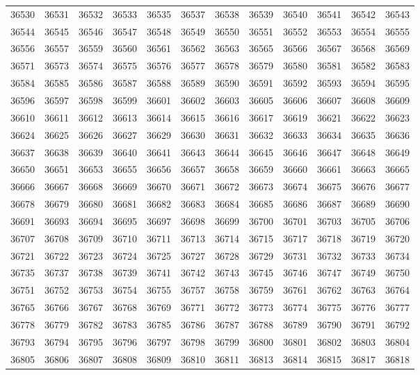 \begin{center}
\begin{longtable}{llllllllllll}
36530 &36531 &36532 &36533 &36535 &36537 &36538 &36539 &36540 &36541 &36542 &36543 \\
36544 &36545 &36546 &36547 &36548 &36549 &36550 &36551 &36552 &36553 &36554 &36555 \\
36556 &36557 &36559 &36560 &36561 &36562 &36563 &36565 &36566 &36567 &36568 &36569 \\
36571 &36573 &36574 &36575 &36576 &36577 &36578 &36579 &36580 &36581 &36582 &36583 \\
36584 &36585 &36586 &36587 &36588 &36589 &36590 &36591 &36592 &36593 &36594 &36595 \\
36596 &36597 &36598 &36599 &36601 &36602 &36603 &36605 &36606 &36607 &36608 &36609 \\
36610 &36611 &36612 &36613 &36614 &36615 &36616 &36617 &36619 &36621 &36622 &36623 \\
36624 &36625 &36626 &36627 &36629 &36630 &36631 &36632 &36633 &36634 &36635 &36636 \\
36637 &36638 &36639 &36640 &36641 &36643 &36644 &36645 &36646 &36647 &36648 &36649 \\
36650 &36651 &36653 &36655 &36656 &36657 &36658 &36659 &36660 &36661 &36663 &36665 \\
36666 &36667 &36668 &36669 &36670 &36671 &36672 &36673 &36674 &36675 &36676 &36677 \\
36678 &36679 &36680 &36681 &36682 &36683 &36684 &36685 &36686 &36687 &36689 &36690 \\
36691 &36693 &36694 &36695 &36697 &36698 &36699 &36700 &36701 &36703 &36705 &36706 \\
36707 &36708 &36709 &36710 &36711 &36713 &36714 &36715 &36717 &36718 &36719 &36720 \\
36721 &36722 &36723 &36724 &36725 &36727 &36728 &36729 &36731 &36732 &36733 &36734 \\
36735 &36737 &36738 &36739 &36741 &36742 &36743 &36745 &36746 &36747 &36749 &36750 \\
36751 &36752 &36753 &36754 &36755 &36757 &36758 &36759 &36761 &36762 &36763 &36764 \\
36765 &36766 &36767 &36768 &36769 &36771 &36772 &36773 &36774 &36775 &36776 &36777 \\
36778 &36779 &36782 &36783 &36785 &36786 &36787 &36788 &36789 &36790 &36791 &36792 \\
36793 &36794 &36795 &36796 &36797 &36798 &36799 &36800 &36801 &36802 &36803 &36804 \\
36805 &36806 &36807 &36808 &36809 &36810 &36811 &36813 &36814 &36815 &36817 &36818 \\

\end{longtable}
\end{center}
